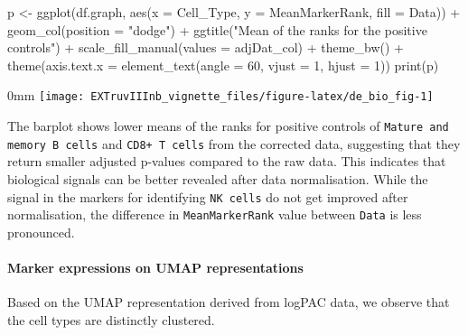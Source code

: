 \documentclass[]{article}
\newcommand{\hlnum}[1]{\textcolor[rgb]{0.816,0.125,0.439}{#1}}%
\newcommand{\hlstr}[1]{\textcolor[rgb]{0.251,0.627,0.251}{#1}}%
\newcommand{\hlstd}[1]{\textcolor[rgb]{0.251,0.251,0.251}{#1}}%
\newenvironment{Shaded}{\begin{myshaded}}{\end{myshaded}}
\newcommand{\DecValTok}[1]{\hlnum{#1}}
\newcommand{\SpecialCharTok}[1]{\hlstr{#1}}
\newcommand{\StringTok}[1]{\hlstr{#1}}
\newcommand{\OtherTok}[1]{{#1}}
\newcommand{\FunctionTok}[1]{\hlstd{#1}}
\newcommand{\AttributeTok}[1]{{#1}}
\newcommand{\NormalTok}[1]{\hlstd{#1}}
\begin{document}
\begin{Shaded}
\begin{Highlighting}[]
\NormalTok{p }\OtherTok{\textless{}{-}} \FunctionTok{ggplot}\NormalTok{(df.graph, }\FunctionTok{aes}\NormalTok{(}\AttributeTok{x =}\NormalTok{ Cell\_Type, }\AttributeTok{y =}\NormalTok{ MeanMarkerRank,}
    \AttributeTok{fill =}\NormalTok{ Data)) }\SpecialCharTok{+} \FunctionTok{geom\_col}\NormalTok{(}\AttributeTok{position =} \StringTok{"dodge"}\NormalTok{) }\SpecialCharTok{+} \FunctionTok{ggtitle}\NormalTok{(}\StringTok{"Mean of the ranks for the positive controls"}\NormalTok{) }\SpecialCharTok{+}
    \FunctionTok{scale\_fill\_manual}\NormalTok{(}\AttributeTok{values =}\NormalTok{ adjDat\_col) }\SpecialCharTok{+} \FunctionTok{theme\_bw}\NormalTok{() }\SpecialCharTok{+} \FunctionTok{theme}\NormalTok{(}\AttributeTok{axis.text.x =} \FunctionTok{element\_text}\NormalTok{(}\AttributeTok{angle =} \DecValTok{60}\NormalTok{,}
    \AttributeTok{vjust =} \DecValTok{1}\NormalTok{, }\AttributeTok{hjust =} \DecValTok{1}\NormalTok{))}
\FunctionTok{print}\NormalTok{(p)}
\end{Highlighting}
\end{Shaded}

\begin{adjustwidth}{\fltoffset}{0mm}
\texttt{[image: EXTruvIIInb\_vignette\_files/figure-latex/de\_bio\_fig-1]} \end{adjustwidth}

The barplot shows lower means of the ranks for positive controls of \texttt{Mature and memory B cells} and \texttt{CD8+ T cells} from the corrected data, suggesting that they return smaller adjusted p-values compared to the raw data. This indicates that biological signals can be better revealed after data normalisation. While the signal in the markers for identifying \texttt{NK cells} do not get improved after normalisation, the difference in \texttt{MeanMarkerRank} value between \texttt{Data} is less pronounced.

\paragraph{Marker expressions on UMAP representations}\label{marker-expressions-on-umap-representations}

Based on the UMAP representation derived from logPAC data, we observe that the cell types are distinctly clustered.
\end{document}
